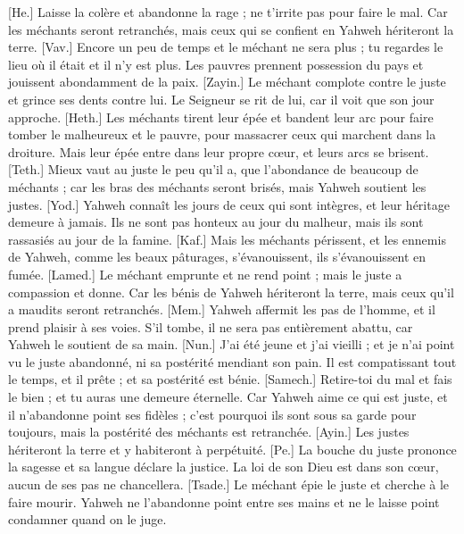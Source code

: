 \begin{multicols}{2}
[He.] Laisse la colère et abandonne la rage ; ne t'irrite pas pour faire le mal.
Car les méchants seront retranchés, mais ceux qui se confient en Yahweh hériteront la terre.
[Vav.] Encore un peu de temps et le méchant ne sera plus ; tu regardes le lieu où il était et il n'y est plus.
Les pauvres prennent possession du pays et jouissent abondamment de la paix.
[Zayin.] Le méchant complote contre le juste et grince ses dents contre lui.
Le Seigneur se rit de lui, car il voit que son jour approche.
[Heth.] Les méchants tirent leur épée et bandent leur arc pour faire tomber le malheureux et le pauvre, pour massacrer ceux qui marchent dans la droiture.
Mais leur épée entre dans leur propre cœur, et leurs arcs se brisent.
[Teth.] Mieux vaut au juste le peu qu'il a, que l'abondance de beaucoup de méchants ;
car les bras des méchants seront brisés, mais Yahweh soutient les justes.
[Yod.] Yahweh connaît les jours de ceux qui sont intègres, et leur héritage demeure à jamais.
Ils ne sont pas honteux au jour du malheur, mais ils sont rassasiés au jour de la famine.
[Kaf.] Mais les méchants périssent, et les ennemis de Yahweh, comme les beaux pâturages, s'évanouissent, ils s'évanouissent en fumée.
[Lamed.] Le méchant emprunte et ne rend point ; mais le juste a compassion et donne.
Car les bénis de Yahweh hériteront la terre, mais ceux qu'il a maudits seront retranchés.
[Mem.] Yahweh affermit les pas de l'homme, et il prend plaisir à ses voies.
S'il tombe, il ne sera pas entièrement abattu, car Yahweh le soutient de sa main.
[Nun.] J'ai été jeune et j'ai vieilli ; et je n'ai point vu le juste abandonné, ni sa postérité mendiant son pain.
Il est compatissant tout le temps, et il prête ; et sa postérité est bénie.
[Samech.] Retire-toi du mal et fais le bien ; et tu auras une demeure éternelle.
Car Yahweh aime ce qui est juste, et il n'abandonne point ses fidèles ; c'est pourquoi ils sont sous sa garde pour toujours, mais la postérité des méchants est retranchée.
[Ayin.] Les justes hériteront la terre et y habiteront à perpétuité.
[Pe.] La bouche du juste prononce la sagesse et sa langue déclare la justice.
La loi de son Dieu est dans son cœur, aucun de ses pas ne chancellera.
[Tsade.] Le méchant épie le juste et cherche à le faire mourir.
Yahweh ne l'abandonne point entre ses mains et ne le laisse point condamner quand on le juge.

\end{multicols}

